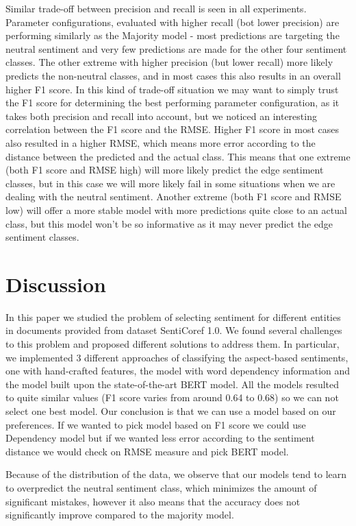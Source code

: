 \documentclass[11pt,a4paper]{article}
\begin{document}
Similar trade-off between precision and recall is seen in all experiments.
Parameter configurations, evaluated with higher recall (bot lower precision) are performing similarly as the Majority model - most predictions are targeting the neutral sentiment and very few predictions are made for the other four sentiment classes.
The other extreme with higher precision (but lower  recall) more likely predicts the non-neutral classes, and in most cases this also results in an overall higher F1 score.
In this kind of trade-off situation we may want to simply trust the F1 score for determining the best performing parameter configuration, as it takes both precision and recall into account, but we noticed an interesting correlation between the F1 score and the RMSE.
Higher F1 score in most cases also resulted in a higher RMSE, which means more error according to the distance between the predicted and the actual class.
This means that one extreme (both F1 score and RMSE high) will more likely predict the edge sentiment classes, but in this case we will more likely fail in some situations when we are dealing with the neutral sentiment.
Another extreme (both F1 score and RMSE low) will offer a more stable model with more predictions quite close to an actual class, but this model won't be so informative as it may never predict the edge sentiment classes.



\section{Discussion}

In this paper we studied the problem of selecting sentiment for different entities in documents provided from dataset SentiCoref  1.0.
We found several challenges to this problem and proposed different solutions to address them. 
In particular, we implemented 3 different approaches of classifying the aspect-based sentiments, one with hand-crafted features, the model with word dependency information and the model built upon the state-of-the-art BERT model. 
All the models resulted to quite similar values (F1 score varies from around 0.64 to 0.68) so we can not select one best model. 
Our conclusion is that we can use a model based on our preferences. 
If we wanted to pick model based on F1 score we could use Dependency model but if we wanted less error according to the sentiment distance we would check on RMSE measure and pick BERT model. 

Because of the distribution of the data, we observe that our models tend to learn to overpredict the neutral sentiment class, which minimizes the amount of significant mistakes, however it also means that the accuracy does not significantly improve compared to the majority model.
\end{document}
